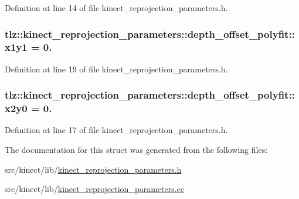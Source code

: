 Definition at line 14 of file kinect\+\_\+reprojection\+\_\+parameters.\+h.

\subsubsection[{\texorpdfstring{x1y1}{x1y1}}]{ tlz\+::kinect\+\_\+reprojection\+\_\+parameters\+::depth\+\_\+offset\+\_\+polyfit\+::x1y1 = 0.}\hypertarget{structtlz_1_1kinect__reprojection__parameters_1_1depth__offset__polyfit_ad94824250f7c6cbf3de12690bdfa29a7}{}\label{structtlz_1_1kinect__reprojection__parameters_1_1depth__offset__polyfit_ad94824250f7c6cbf3de12690bdfa29a7}


Definition at line 19 of file kinect\+\_\+reprojection\+\_\+parameters.\+h.

\subsubsection[{\texorpdfstring{x2y0}{x2y0}}]{ tlz\+::kinect\+\_\+reprojection\+\_\+parameters\+::depth\+\_\+offset\+\_\+polyfit\+::x2y0 = 0.}\hypertarget{structtlz_1_1kinect__reprojection__parameters_1_1depth__offset__polyfit_a92b3758eeb45c26a7771827fa5ba5cfa}{}\label{structtlz_1_1kinect__reprojection__parameters_1_1depth__offset__polyfit_a92b3758eeb45c26a7771827fa5ba5cfa}


Definition at line 17 of file kinect\+\_\+reprojection\+\_\+parameters.\+h.



The documentation for this struct was generated from the following files\+:\begin{DoxyCompactItemize}
\item 
src/kinect/lib/\hyperlink{kinect__reprojection__parameters_8h}{kinect\+\_\+reprojection\+\_\+parameters.\+h}\item 
src/kinect/lib/\hyperlink{kinect__reprojection__parameters_8cc}{kinect\+\_\+reprojection\+\_\+parameters.\+cc}\end{DoxyCompactItemize}
